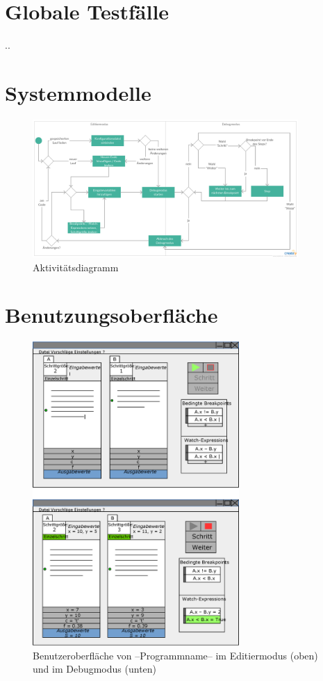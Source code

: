 \documentclass[parskip=full]{scrartcl}
\begin{document}
\section{Globale Testfälle}
..

\newpage
\section{Systemmodelle}
\begin{figure}[h] 
  \centering
     \includegraphics[width=0.9\textwidth]{Aktivitaetsdiagramm}
  \caption{Aktivitätsdiagramm}
  \label{fig:Bild1}
\end{figure}

\newpage
\section{Benutzungsoberfläche}
\begin{figure}[!ht] 
    \vspace{-10pt}
    \centering
       \includegraphics[width=0.7\textwidth]{skizzeFull.eps}
       \caption{
         Benutzeroberfläche von --Programmname-- im Editiermodus (oben) und im Debugmodus
         (unten)
       }
    \label{fig:Bild1}
\end{figure}
\end{document}

